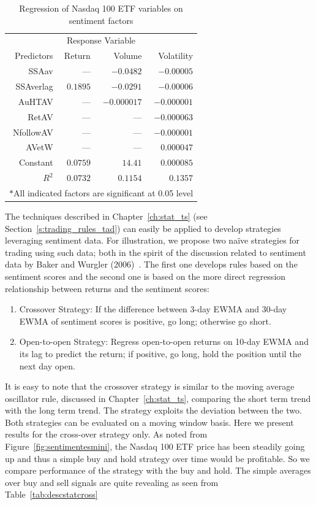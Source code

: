 	\begin{table}[!ht]
	\centering
	\caption{Regression of Nasdaq 100 ETF variables on sentiment factors \label{tab:regesmini}}
	\begin{tabular}{rrrr}
	\multicolumn{4}{c}{Response Variable} \\
	Predictors & Return & Volume & Volatility \\ \hline
	SSAav & --- & $-0.0482$ & $-0.00005$ \\
	SSAverlag & $0.1895$ & $-0.0291$ & $-0.00006$ \\
	AuHTAV & --- & $-0.000017$ & $-0.000001$ \\
	RetAV & --- & --- & $-0.000063$ \\
	NfollowAV & --- & --- & $-0.000001$ \\
	AVetW & --- & --- & $0.000047$ \\
	Constant & $0.0759$ & $14.41$ & $0.000085$ \\ \hline
	$R^2$ & $0.0732$ & $0.1154$ & $0.1357$ \\ \hline
	\multicolumn{4}{c}{$\ast$All indicated factors are significant at 0.05 level}
	\end{tabular} 
	\end{table}

The techniques described in Chapter~\ref{ch:stat_ts} (see Section~\ref{s:trading_rules_tad}) can easily be applied to develop strategies leveraging sentiment data. For illustration, we propose two na\"ive strategies for trading using such data; both in the spirit of the discussion related to sentiment data by Baker and Wurgler (2006)~\cite{baker2006investor}. The first one develops rules based on the sentiment scores and the second one is based on the more direct regression relationship between returns and the sentiment scores: 

\begin{enumerate}[1.]
\item Crossover Strategy: If the difference between 3-day EWMA and 30-day EWMA of sentiment scores is positive, go long; otherwise go short. 
\item Open-to-open Strategy: Regress open-to-open returns on 10-day EWMA and its lag to predict the return; if positive, go long, hold the position until the next day open. 
\end{enumerate}


It is easy to note that the crossover strategy is similar to the moving average oscillator rule, discussed in Chapter~\ref{ch:stat_ts}, comparing the short term trend with the long term trend. The strategy exploits the deviation between the two. Both strategies can be evaluated on a moving window basis. Here we present results for the cross-over strategy only. As noted from Figure~\ref{fig:sentimentesmini}, the Nasdaq 100 ETF price has been steadily going up and thus a simple buy and hold strategy over time would be profitable. So we compare performance of the strategy with the buy and hold. The simple averages over buy and sell signals are quite revealing as seen from Table~\ref{tab:descstatcross}

